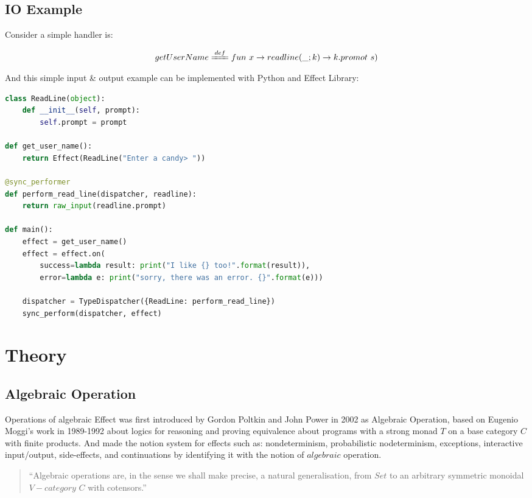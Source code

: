 \documentclass{article}
\begin{document}
\subsection{IO Example}

Consider a simple handler is:

\begin{gather}
  getUserName \xlongequal[]{def} fun\ x \rightarrow readline(\_; k) \rightarrow k.promot\ s)
\end{gather}

And this simple input \& output example can be implemented with Python and Effect Library\cite{python-effect}:

\begin{lstlisting}[language=Python]
class ReadLine(object):
    def __init__(self, prompt):
        self.prompt = prompt

def get_user_name():
    return Effect(ReadLine("Enter a candy> "))

@sync_performer
def perform_read_line(dispatcher, readline):
    return raw_input(readline.prompt)

def main():
    effect = get_user_name()
    effect = effect.on(
        success=lambda result: print("I like {} too!".format(result)),
        error=lambda e: print("sorry, there was an error. {}".format(e)))

    dispatcher = TypeDispatcher({ReadLine: perform_read_line})
    sync_perform(dispatcher, effect)
\end{lstlisting}


\section{Theory}
\subsection{Algebraic Operation}
Operations of algebraic Effect was first introduced by Gordon Poltkin and John Power in 2002 \cite{Plotkin2003} as Algebraic Operation, based on Eugenio Moggi's work \cite{39155, MOGGI91} in 1989-1992 about logics for reasoning and proving equivalence about programs with a strong monad $T$ on a base category $C$ with finite products\cite{Plotkin2003, MOGGI91}. And made the notion system for effects such as: nondeterminism, probabilistic nodeterminism, exceptions, interactive input/output, side-effects, and continuations by identifying it with the notion of $algebraic$ operation.

\begin{quotation}
  ``Algebraic operations are, in the sense we shall make precise, a natural generalisation, from $Set$ to an arbitrary symmetric monoidal $V-category$ $C$ with cotensors.''\cite{Plotkin2003}
\end{quotation}
\end{document}
